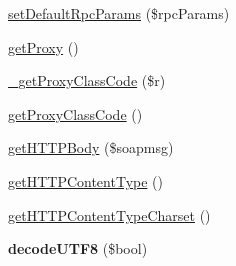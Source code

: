\begin{DoxyCompactItemize}
\hyperlink{classsoapclient_a9d7b3609d1db3eb5f2d3cf92510e4e6b}{set\-Default\-Rpc\-Params} (\$rpc\-Params)
\item 
\hyperlink{classsoapclient_a839ac5be1fce2af15c73aef02a49a8af}{get\-Proxy} ()
\item 
\hyperlink{classsoapclient_a2b49882c792a4deb80ec35ca75f1fee6}{\-\_\-get\-Proxy\-Class\-Code} (\$r)
\item 
\hyperlink{classsoapclient_a5fbf58b6ba27a02544885d4fc801d328}{get\-Proxy\-Class\-Code} ()
\item 
\hyperlink{classsoapclient_ab1e22b0858bdbe61d2d711ff442c0e78}{get\-H\-T\-T\-P\-Body} (\$soapmsg)
\item 
\hyperlink{classsoapclient_a2bed19ef2d537dee244535339cd6026a}{get\-H\-T\-T\-P\-Content\-Type} ()
\item 
\hyperlink{classsoapclient_a9051db33a9b7e50315d9222ef1c52ce9}{get\-H\-T\-T\-P\-Content\-Type\-Charset} ()
\item 
\hypertarget{classsoapclient_a8ebcfd008049181e64a5046eb8c168b9}{{\bfseries decode\-U\-T\-F8} (\$bool)}\label{classsoapclient_a8ebcfd008049181e64a5046eb8c168b9}


\end{DoxyCompactItemize}
